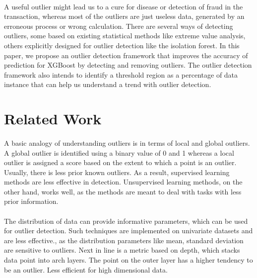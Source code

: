 \documentclass[runningheads]{llncs}
\begin{document}
\paragraph{} A useful outlier might lead us to a cure for disease or detection of fraud in the transaction, whereas most of the outliers are just useless data, generated by an erroneous process or wrong calculation. There are several ways of detecting outliers, some based on existing statistical methods like extreme value analysis, others explicitly designed for outlier detection like the isolation forest. In this paper, we propose an outlier detection framework that improves the accuracy of prediction for XGBoost by detecting and removing outliers. The outlier detection framework also intends to identify a threshold region as a percentage of data instance that can help us understand a trend with outlier detection.

\section{Related Work}


\paragraph{} A basic analogy of understanding outliers is in terms of local and global outliers. A global outlier is identified using a binary value of 0 and 1 whereas a local outlier is assigned a score based on the extent to which a point is an outlier. Usually, there is less prior known outliers. As a result, supervised learning methods are less effective in detection. Unsupervised learning methods, on the other hand, works well, as the methods are meant to deal with tasks with less prior information.

\paragraph{} The distribution of data can provide informative parameters,  which can be used for outlier detection. Such techniques are implemented on univariate datasets and are less effective., as the distribution parameters like mean, standard deviation are sensitive to outliers. 
Next in line is a metric based on depth, which stacks data point into arch layers. The point on the outer layer has a higher tendency to be an outlier. Less efficient for high dimensional data.
\end{document}
